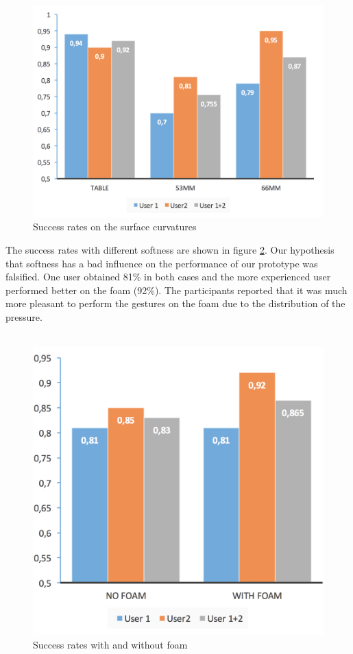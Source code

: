 \begin{figure}
\includegraphics[scale=0.15]{images/surface.jpg}
\caption{Success rates on the surface curvatures}
\label{fig:surface}
\end{figure}
The success rates with different softness are shown in figure \ref{fig:foam}. Our hypothesis  that softness has a bad influence on the performance of our prototype was falsified. One user obtained 81\%  in both cases and the more experienced user performed better on the foam (92\%). The participants reported that it was much more pleasant to perform the gestures on the foam due to the distribution of the pressure. 
\\ \\
\begin{center}
\begin{figure}
\includegraphics[scale=0.21]{images/foam.jpg}
\caption{Success rates with and without foam}
\label{fig:foam}
\end{figure}
\end{center}
